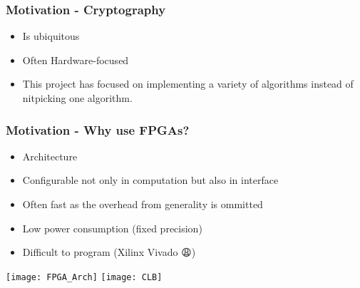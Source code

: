\begin{frame}
  \frametitle{Motivation - Cryptography}
  \begin{itemize}
    \item Is ubiquitous
    \item Often Hardware-focused
    \item This project has focused on implementing a variety of algorithms instead of nitpicking one algorithm.
  \end{itemize}
\end{frame}
\begin{frame}
  \frametitle{Motivation - Why use FPGAs?}
  \begin{minipage}[b]{0.45\textwidth}
  \begin{itemize}
    \item Architecture
    \item Configurable not only in computation but also in interface
    \item Often fast as the overhead from generality is ommitted
    \item Low power consumption (fixed precision)
    \item Difficult to program (Xilinx Vivado {\DejaSans 😩})
  \end{itemize}
  \end{minipage}
\vspace{30px}
\begin{minipage}[b]{0.50\textwidth}
\texttt{[image: FPGA\_Arch]}
\texttt{[image: CLB]}
\end{minipage}
\end{frame}

